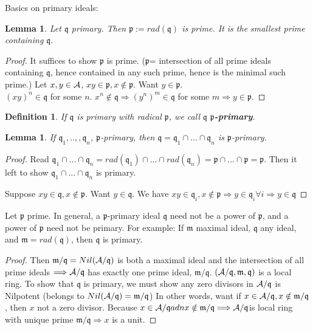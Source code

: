\documentclass[11pt]{article}
\newtheorem{lemma}[thm]{Lemma}
\newtheorem{dfn}[thm]{Definition}
\newcommand{\scm}{{\mathfrak m}}
\newcommand{\scp}{{\mathfrak p}}
\newcommand{\scq}{\mathfrak q}
\newcommand{\cala}{{\cal A}}
\newcommand{\Lrta}{\Longrightarrow}
\begin{document}
Basics on primary ideals:\\
\begin{lemma}
Let $\scq$ primary. Then $\scp:=rad(\scq)$ is prime. It is the smallest prime containing $\scq.$
\end{lemma}
\begin{proof}
It suffices to show $\scp$ is prime. ($\scp$= intersection of all prime ideals containing $\scq$, hence contained in any such prime, hence is the minimal such prime.) Let $x,y\in\cala$, $xy\in\scp,x\notin \scp$. Want $y\in\scp$.\\
 $(xy)^n\in\scq$ for some $n$. $x^n\notin\scq\Lrta (y^n)^m\in\scq $ for some $m$$\Lrta  y\in\scp$.
\end{proof}
\begin{dfn}
If $\scq$ is primary with radical $\scp$, we call $\scq$ \textbf{$\scp$-primary}.
\end{dfn}
\begin{lemma}
If $\scq_1,..,,\scq_n$, $\scp$-primary, then $\scq=\scq_1\cap...\cap \scq_n$ is $\scp$-primary.
\end{lemma}
\begin{proof}
Read $\scq_1\cap...\cap\scq_n=rad(\scq_1)\cap...\cap rad(\scq_n)=\scp\cap...\cap \scp=\scp$. Then it left to show $\scq_1\cap...\cap\scq_n$ is primary. 

Suppose $xy\in\scq, x\notin \scp$. Want $y\in \scq$. We have $xy\in \scq_i,x\notin\scp\Lrta y\in \scq_i\forall i\Lrta y\in\scq$
\end{proof}

Let $\scp$ prime. In general, a $\scp$-primary ideal $\scq$ need not be a power of $\scp$, and a power of $\scp$ need not be primary. For example:
If $\scm$ maximal ideal, $\scq$ any ideal, and $\scm=rad(\scq)$, then $\scq$ is primary.
\begin{proof}
Then $\scm/\scq=Nil(\cala/\scq)$ is both a maximal ideal and the intersection of all prime ideals $\Lrta\cala/\scq$ has exactly one prime ideal, $\scm/\scq$. $(\cala/\scq,\scm,\scq)$ is a local ring. To show that $\scq$ is primary, we must show any zero divisors in $\cala/\scq$ is Nilpotent (belongs to $Nil(\cala/\scq)=\scm/\scq$) In other words, want if $x\in\cala/\scq,x\notin\scm/\scq$, then $x$ not a zero divisor. Because $x\in\cala/\scq adn x\notin \scm/\scq\Lrta \cala/\scq $is local ring with unique prime $\scm/\scq\Lrta x$ is a unit.
\end{proof}
\end{document}
